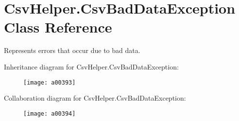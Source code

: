 \hypertarget{a00058}{\section{Csv\-Helper.\-Csv\-Bad\-Data\-Exception Class Reference}
\label{a00058}
}


Represents errors that occur due to bad data.  




Inheritance diagram for Csv\-Helper.\-Csv\-Bad\-Data\-Exception\-:
\nopagebreak
\begin{figure}[H]
\begin{center}
\leavevmode
\texttt{[image: a00393]}
\end{center}
\end{figure}


Collaboration diagram for Csv\-Helper.\-Csv\-Bad\-Data\-Exception\-:
\nopagebreak
\begin{figure}[H]
\begin{center}
\leavevmode
\texttt{[image: a00394]}
\end{center}
\end{figure}
